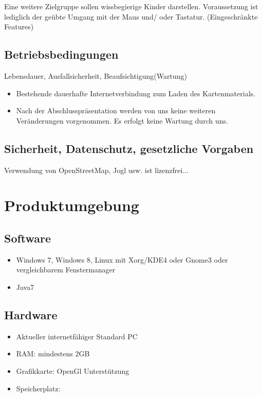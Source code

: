 \documentclass[10pt]{scrreprt}
\begin{document}
Eine weitere Zielgruppe sollen wissbegierige Kinder darstellen. Voraussetzung ist lediglich der geübte Umgang mit der Maus und/ oder Tastatur. (Eingeschränkte Features)

\section{Betriebsbedingungen}
Lebensdauer, Ausfallsicherheit, Beaufsichtigung(Wartung)

\begin{itemize}
\item Bestehende dauerhafte Internetverbindung zum Laden des Kartenmaterials.
\item Nach  der  Abschlusspräsentation  werden  von  uns  keine  weiteren 
Veränderungen vorgenommen. Es erfolgt keine Wartung durch uns.
\end{itemize} 

\section{Sicherheit, Datenschutz, gesetzliche Vorgaben}
Verwendung von OpenStreetMap, Jogl usw. ist lizenzfrei...




\chapter{Produktumgebung}
\section{Software}
\begin{itemize}
\item Windows 7, Windows 8, Linux mit Xorg/KDE4 oder Gnome3 oder vergleichbarem Fenstermanager
\item Java7 
\end{itemize}


\section{Hardware}
\begin{itemize}
\item Aktueller internetfähiger Standard PC
\item RAM: mindestens 2GB
\item Grafikkarte: OpenGl Unterstützung
\item Speicherplatz: 
\end{itemize}
\end{document}
